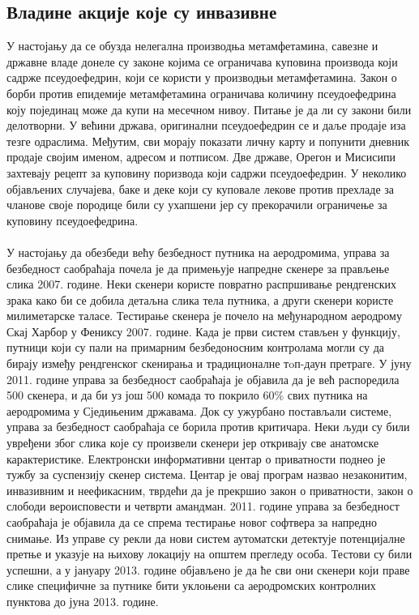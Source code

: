 \documentclass{article}
\begin{document}
\subsection{Владине акције које су инвазивне}
У настојању да се обузда нелегална производња метамфетамина, савезне и државне владе донеле су законе којима се ограничава куповина производа који садрже псеудоефедрин, који се користи у производњи метамфетамина. Закон о борби против епидемије метамфетамина ограничава количину псеудоефедрина коју појединац може да купи на месечном нивоу. Питање је да ли су закони били делотворни. У већини држава, оригинални псеудоефедрин се и даље продаје иза тезге одраслима. Међутим, сви морају показати личну карту и попунити дневник продаје својим именом, адресом и потписом. Две државе, Орегон и Мисисипи захтевају рецепт за куповину поризвода који садржи псеудоефедрин. У неколико објављених случајева, баке и деке који су куповале лекове против прехладе за чланове своје породице били су ухапшени јер су прекорачили ограничење за куповину псеудоефедрина.
\\\\
У настојању да обезбеди већу безбедност путника на аеродромима, управа за безбедност саобраћаја почела је да примењује напредне скенере за прављење слика 2007. године. Неки скенери користе повратно распршивање рендгенских зрака како би се добила детаљна слика тела путника, а други скенери користе милиметарске таласе. Тестирање скенера је почело на међународном аеродрому Скај Харбор у Фениксу 2007. године. Када је први систем стављен у функцију, путници који су пали на примарним безбедоносним контролама могли су да бирају између рендгенског скенирања и традиционалне тoп-даун претраге. У јуну 2011. године управа за безбедност саобраћаја је објавила да је већ распоредила 500 скенера, и да би уз још 500 комада то покрило 60\% свих путника на аеродромима у Сједињеним државама. Док су ужурбано постављали системе, управа за безбедност саобраћаја се борила против критичара. Неки људи су били увређени због слика које су произвели скенери јер откривају све анатомске карактеристике. Електронски информативни центар о приватности поднео је тужбу за суспензију скенер система. Центар је овај програм назвао незаконитим, инвазивним и неефикасним, тврдећи да је прекршио закон о приватности, закон о слободи вероисповести и четврти амандман. 2011. године управа за безбедност саобраћаја је објавила да се спрема тестирање новог софтвера за напредно снимање. Из управе су рекли да нови систем аутоматски детектује потенцијалне претње и указује на њихову локацију на општем прегледу особа. Тестови су били успешни, а у јануару 2013. године објављено је да ће сви они скенери који праве слике специфичне за путнике бити уклоњени са аеродромских контролних пунктова до јуна 2013. године.
\end{document}
